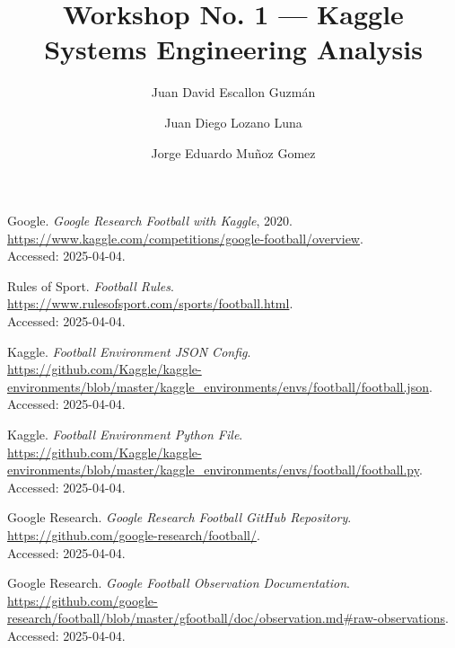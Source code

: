 \documentclass[12pt, a4paper]{report}  %
\begin{document}
\title{Workshop No. 1 — Kaggle Systems Engineering Analysis}
\author{Juan David Escallon Guzmán \and Juan Diego Lozano Luna \and Jorge Eduardo Muñoz Gomez}
\maketitle

\tableofcontents
\newpage

 

 



 




\begin{thebibliography}{9}

    Google. \emph{Google Research Football with Kaggle}, 2020.\\
    \url{https://www.kaggle.com/competitions/google-football/overview}.\\
    Accessed: 2025-04-04.
    
    Rules of Sport. \emph{Football Rules}.\\
    \url{https://www.rulesofsport.com/sports/football.html}.\\
    Accessed: 2025-04-04.
    
    Kaggle. \emph{Football Environment JSON Config}.\\
    \url{https://github.com/Kaggle/kaggle-environments/blob/master/kaggle_environments/envs/football/football.json}.\\
    Accessed: 2025-04-04.
    
    Kaggle. \emph{Football Environment Python File}.\\
    \url{https://github.com/Kaggle/kaggle-environments/blob/master/kaggle_environments/envs/football/football.py}.\\
    Accessed: 2025-04-04.
    
    Google Research. \emph{Google Research Football GitHub Repository}.\\
    \url{https://github.com/google-research/football/}.\\
    Accessed: 2025-04-04.
    
    Google Research. \emph{Google Football Observation Documentation}.\\
    \url{https://github.com/google-research/football/blob/master/gfootball/doc/observation.md#raw-observations}.\\
    Accessed: 2025-04-04.
    
    \end{thebibliography}
    
\end{document}
